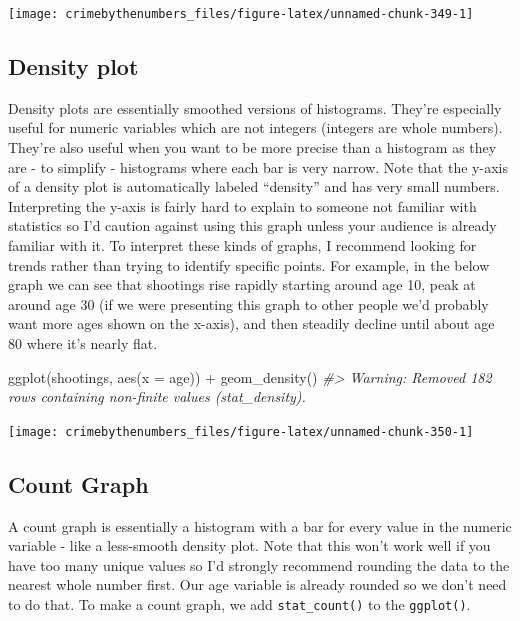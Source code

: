 \documentclass[
]{krantz}
\makeatletter
\newenvironment{Shaded}{\begin{snugshade}}{\end{snugshade}}
\newcommand{\AttributeTok}[1]{\textcolor[rgb]{0.61,0.61,0.61}{#1}}
\newcommand{\CommentTok}[1]{\textcolor[rgb]{0.37,0.37,0.37}{\textit{#1}}}
\newcommand{\FunctionTok}[1]{\textcolor[rgb]{0,0,0}{#1}}
\newcommand{\NormalTok}[1]{#1}
\newcommand{\SpecialCharTok}[1]{\textcolor[rgb]{0,0,0}{#1}}
\newenvironment{kframe}{%
\medskip{}
\setlength{\fboxsep}{.8em}
 \def\at@end@of@kframe{}%
 \ifinner\ifhmode%
  \def\at@end@of@kframe{\end{minipage}}%
  \begin{minipage}{\columnwidth}%
 \fi\fi%
 \def\FrameCommand##1{\hskip\@totalleftmargin \hskip-\fboxsep
 \colorbox{shadecolor}{##1}\hskip-\fboxsep
     \hskip-\linewidth \hskip-\@totalleftmargin \hskip\columnwidth}%
 \MakeFramed {\advance\hsize-\width
   \@totalleftmargin\z@ \linewidth\hsize
   \@setminipage}}%
 {\par\unskip\endMakeFramed%
 \at@end@of@kframe}
\renewenvironment{Shaded}{\begin{kframe}}{\end{kframe}}
\makeatother
\begin{document}
\begin{center}\texttt{[image: crimebythenumbers\_files/figure-latex/unnamed-chunk-349-1]} \end{center}

\hypertarget{density-plot}{%
\subsection{Density plot}\label{density-plot}}

Density plots are essentially smoothed versions of histograms. They're especially useful for numeric variables which are not integers (integers are whole numbers). They're also useful when you want to be more precise than a histogram as they are - to simplify - histograms where each bar is very narrow. Note that the y-axis of a density plot is automatically labeled ``density'' and has very small numbers. Interpreting the y-axis is fairly hard to explain to someone not familiar with statistics so I'd caution against using this graph unless your audience is already familiar with it. To interpret these kinds of graphs, I recommend looking for trends rather than trying to identify specific points. For example, in the below graph we can see that shootings rise rapidly starting around age 10, peak at around age 30 (if we were presenting this graph to other people we'd probably want more ages shown on the x-axis), and then steadily decline until about age 80 where it's nearly flat.

\begin{Shaded}
\begin{Highlighting}[]
\FunctionTok{ggplot}\NormalTok{(shootings, }\FunctionTok{aes}\NormalTok{(}\AttributeTok{x =}\NormalTok{ age)) }\SpecialCharTok{+} 
  \FunctionTok{geom\_density}\NormalTok{()}
\CommentTok{\#\textgreater{} Warning: Removed 182 rows containing non{-}finite values (stat\_density).}
\end{Highlighting}
\end{Shaded}

\begin{center}\texttt{[image: crimebythenumbers\_files/figure-latex/unnamed-chunk-350-1]} \end{center}

\hypertarget{count-graph}{%
\subsection{Count Graph}\label{count-graph}}

A count graph is essentially a histogram with a bar for every value in the numeric variable - like a less-smooth density plot. Note that this won't work well if you have too many unique values so I'd strongly recommend rounding the data to the nearest whole number first. Our age variable is already rounded so we don't need to do that. To make a count graph, we add \texttt{stat\_count()} to the \texttt{ggplot()}.
\end{document}
